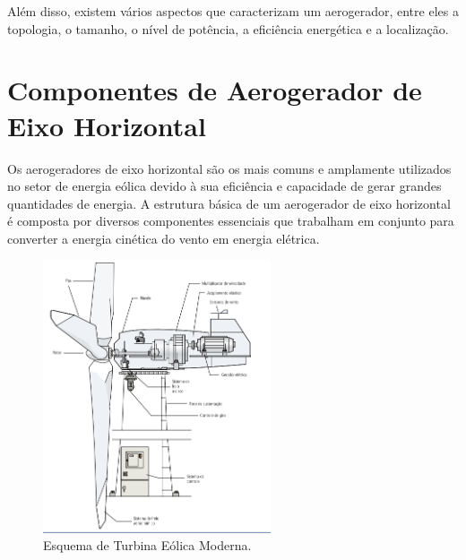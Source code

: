 \par Além disso, existem vários aspectos que caracterizam um aerogerador, entre eles a topologia, o tamanho, o nível de potência, a eficiência energética e a localização.



\section{Componentes de Aerogerador de Eixo Horizontal}  

\par Os aerogeradores de eixo horizontal são os mais comuns e amplamente utilizados no setor de energia eólica devido à sua eficiência e capacidade de gerar grandes quantidades de energia. A estrutura básica de um aerogerador de eixo horizontal é composta por diversos componentes essenciais que trabalham em conjunto para converter a energia cinética do vento em energia elétrica.

\begin{figure}[H]
    \caption{Esquema de Turbina Eólica Moderna.}
    \label{fig:EsquemaTurbina}
    \centering
    \includegraphics[width=0.6\textwidth]{Figuras/Teorico/Construtivos.png}
\end{figure}



